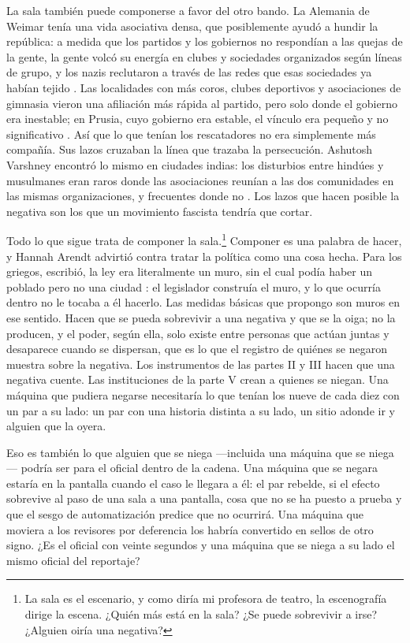 La sala también puede componerse a favor del otro bando. La Alemania de Weimar tenía una vida asociativa densa, que posiblemente ayudó a hundir la república: a medida que los partidos y los gobiernos no respondían a las quejas de la gente, la gente volcó su energía en clubes y sociedades organizados según líneas de grupo, y los nazis reclutaron a través de las redes que esas sociedades ya habían tejido \autocite{berman1997weimar}. Las localidades con más coros, clubes deportivos y asociaciones de gimnasia vieron una afiliación más rápida al partido, pero solo donde el gobierno era inestable; en Prusia, cuyo gobierno era estable, el vínculo era pequeño y no significativo \autocite{satyanath2017bowling}. Así que lo que tenían los rescatadores no era simplemente más compañía. Sus lazos cruzaban la línea que trazaba la persecución. Ashutosh Varshney encontró lo mismo en ciudades indias: los disturbios entre hindúes y musulmanes eran raros donde las asociaciones reunían a las dos comunidades en las mismas organizaciones, y frecuentes donde no \autocite{varshney2002ethnic}. Los lazos que hacen posible la negativa son los que un movimiento fascista tendría que cortar.

Todo lo que sigue trata de componer la sala.\footnote{La sala es el escenario, y como diría mi profesora de teatro, la escenografía dirige la escena. ¿Quién más está en la sala? ¿Se puede sobrevivir a irse? ¿Alguien oiría una negativa?} Componer es una palabra de hacer, y Hannah Arendt advirtió contra tratar la política como una cosa hecha. Para los griegos, escribió, la ley era literalmente un muro, sin el cual podía haber un poblado pero no una ciudad \autocite{arendt1958human}: el legislador construía el muro, y lo que ocurría dentro no le tocaba a él hacerlo. Las medidas básicas que propongo son muros en ese sentido. Hacen que se pueda sobrevivir a una negativa y que se la oiga; no la producen, y el poder, según ella, solo existe entre personas que actúan juntas y desaparece cuando se dispersan, que es lo que el registro de quiénes se negaron muestra sobre la negativa. Los instrumentos de las partes II y III hacen que una negativa cuente. Las instituciones de la parte V crean a quienes se niegan. Una máquina que pudiera negarse necesitaría lo que tenían los nueve de cada diez con un par a su lado: un par con una historia distinta a su lado, un sitio adonde ir y alguien que la oyera.

Eso es también lo que alguien que se niega —incluida una máquina que se niega— podría ser para el oficial dentro de la cadena. Una máquina que se negara estaría en la pantalla cuando el caso le llegara a él: el par rebelde, si el efecto sobrevive al paso de una sala a una pantalla, cosa que no se ha puesto a prueba y que el sesgo de automatización predice que no ocurrirá. Una máquina que moviera a los revisores por deferencia los habría convertido en sellos de otro signo. ¿Es el oficial con veinte segundos y una máquina que se niega a su lado el mismo oficial del reportaje?

